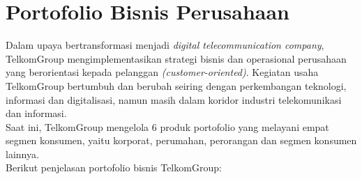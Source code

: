 \section{Portofolio Bisnis Perusahaan}
\tab Dalam upaya bertransformasi menjadi \textit{digital telecommunication company}, TelkomGroup mengimplementasikan strategi bisnis dan operasional perusahaan yang berorientasi kepada pelanggan \textit{(customer-oriented)}. Kegiatan usaha TelkomGroup bertumbuh dan berubah seiring dengan perkembangan teknologi, informasi dan digitalisasi, namun masih dalam koridor industri telekomunikasi dan informasi.\\
\tab Saat ini, TelkomGroup mengelola 6 produk portofolio yang melayani empat segmen konsumen, yaitu korporat, perumahan, perorangan dan segmen konsumen lainnya.\\
\tab Berikut penjelasan portofolio bisnis TelkomGroup:
